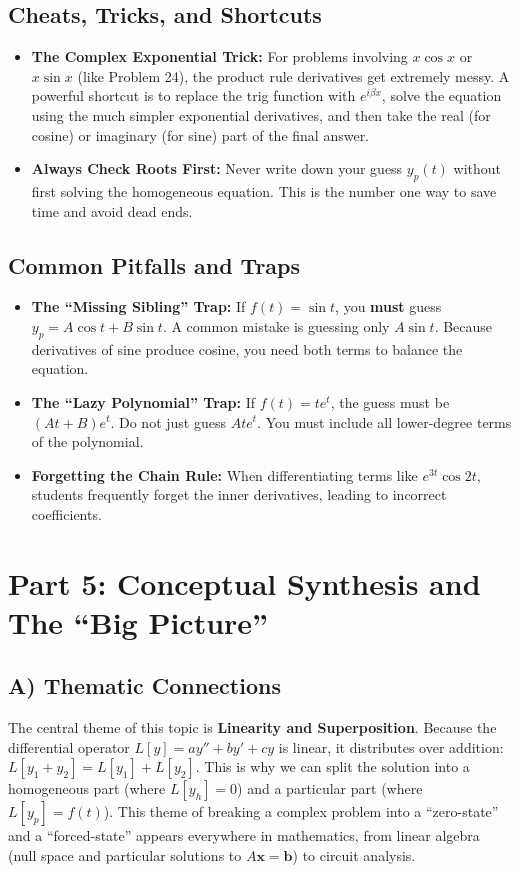 \documentclass[12pt]{article}
\begin{document}
\subsection{Cheats, Tricks, and Shortcuts}
\begin{itemize}
    \item \textbf{The Complex Exponential Trick:} For problems involving $x \cos x$ or $x \sin x$ (like Problem 24), the product rule derivatives get extremely messy. A powerful shortcut is to replace the trig function with $e^{i\beta x}$, solve the equation using the much simpler exponential derivatives, and then take the real (for cosine) or imaginary (for sine) part of the final answer.
    \item \textbf{Always Check Roots First:} Never write down your guess $y_p(t)$ without first solving the homogeneous equation. This is the number one way to save time and avoid dead ends.
\end{itemize}

\subsection{Common Pitfalls and Traps}
\begin{itemize}
    \item \textbf{The ``Missing Sibling'' Trap:} If $f(t) = \sin t$, you \textbf{must} guess $y_p = A \cos t + B \sin t$. A common mistake is guessing only $A \sin t$. Because derivatives of sine produce cosine, you need both terms to balance the equation.
    \item \textbf{The ``Lazy Polynomial'' Trap:} If $f(t) = t e^t$, the guess must be $(At + B)e^t$. Do not just guess $A t e^t$. You must include all lower-degree terms of the polynomial.
    \item \textbf{Forgetting the Chain Rule:} When differentiating terms like $e^{3t} \cos 2t$, students frequently forget the inner derivatives, leading to incorrect coefficients.
\end{itemize}

\newpage
\section{Part 5: Conceptual Synthesis and The ``Big Picture''}

\subsection{A) Thematic Connections}
The central theme of this topic is \textbf{Linearity and Superposition}. Because the differential operator $L[y] = ay'' + by' + cy$ is linear, it distributes over addition: $L[y_1 + y_2] = L[y_1] + L[y_2]$. This is why we can split the solution into a homogeneous part (where $L[y_h] = 0$) and a particular part (where $L[y_p] = f(t)$). This theme of breaking a complex problem into a ``zero-state'' and a ``forced-state'' appears everywhere in mathematics, from linear algebra (null space and particular solutions to $A\mathbf{x} = \mathbf{b}$) to circuit analysis.
\end{document}

